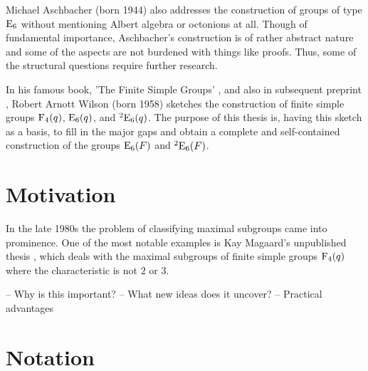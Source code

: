 Michael Aschbacher (born 1944) also addresses the 
construction of groups of type $\mathrm{E}_6$ without mentioning Albert
algebra or octonions at all. Though of fundamental importance,
Aschbacher's construction is of rather abstract nature and some
of the aspects are not burdened with things like proofs. Thus,
some of the structural questions require further research. 

In his famous book, 'The Finite Simple Groups' \cite{WilsonBook},
and also in subsequent preprint \cite{WilsonPaper},
Robert Arnott Wilson (born 1958) sketches the
construction of finite simple groups $\mathrm{F}_4(q)$, 
$\mathrm{E}_6(q)$, and ${}^2\mathrm{E}_6(q)$. The purpose of this thesis is,
having this sketch as a basis, to fill in the major gaps and 
obtain a complete and self-contained construction of the groups 
$\mathrm{E}_6(F)$ and ${}^2\mathrm{E}_6(F)$.

\section{{Motivation}}

In the late 1980s the problem of classifying maximal subgroups 
came into prominence. One of the most notable examples is
Kay Magaard's unpublished thesis \cite{Magaard}, which deals
with the maximal subgroups of finite simple groups $\mathrm{F}_4(q)$
where the characteristic is not $2$ or $3$. 

-- Why is this important? 
-- What new ideas does it uncover?
-- Practical advantages

\section{{Notation}}



